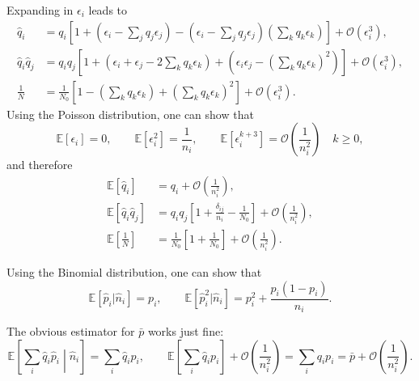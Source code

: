 \documentclass[12pt]{article}
\newcommand{\E}{\mathbb{E}}
\newcommand{\CO}{\mathcal{O}}
\newcommand{\prn}[1]{\left ( #1 \right )}
\newcommand{\brk}[1]{\left [ #1 \right ]}
\begin{document}
Expanding in $\epsilon_i$ leads to
%
\begin{equation}\label{eq:expandeps}
  \begin{aligned}
    \hat{q}_i &= q_i\brk{ 1 + \prn{\epsilon_i-\sum_jq_j\epsilon_j} -  \prn{\epsilon_i-\sum_jq_j\epsilon_j} \prn{\sum_kq_k\epsilon_k} } +\CO\prn{\epsilon_i^3}, \\
    \hat{q}_i\hat{q}_j &= q_iq_j\brk{ 1 + \prn{\epsilon_i+\epsilon_j-2\sum_kq_k\epsilon_k} +  \prn{\epsilon_i\epsilon_j-(\sum_kq_k\epsilon_k)^2} }  +\CO\prn{\epsilon_i^3}, \\
    \frac{1}{N} &= \frac{1}{N_0} \brk{ 1 - \prn{\sum_kq_k\epsilon_k} +  \prn{\sum_kq_k\epsilon_k}^2 } +\CO\prn{\epsilon_i^3}.
  \end{aligned}
\end{equation}
%
Using the Poisson distribution, one can show that
%
\begin{equation}\label{eq:expeps}
    \E\brk{\epsilon_i} = 0, \qquad
    \E\brk{\epsilon_i^2} = \frac{1}{n_i}, \qquad
    \E\brk{\epsilon_i^{k+3}} = \CO\prn{\frac{1}{n_i^2}} \quad k\geq0,
\end{equation}
%
and therefore
%
\begin{equation}\label{eq:expandepsex}
  \begin{aligned}
    \E\brk{\hat{q}_i} &= q_i + \CO\prn{\frac{1}{n_i^2}}, \\
    \E\brk{\hat{q}_i\hat{q}_j} &= q_iq_j\brk{ 1 + \frac{\delta_{ij}}{n_i} -  \frac{1}{N_0}}  + \CO\prn{\frac{1}{n_i^2}}, \\
    \E\brk{\frac{1}{N}} &= \frac{1}{N_0} \brk{ 1  +  \frac{1}{N_0} } + \CO\prn{\frac{1}{n_i^2}}.
  \end{aligned}
\end{equation}
%

Using the Binomial distribution, one can show that
%
\begin{equation}\label{eq:expi}
  \E\brk{\hat{p}_i|\hat{n}_i} = p_i, \qquad
  \E\brk{\hat{p}_i^2|\hat{n}_i} = p_i^2 + \frac{p_i(1-p_i)}{n_i}.
\end{equation}
%

The obvious estimator for $\bar{p}$ works just fine:
%
\begin{equation}\label{eq:pbarest}
  \E\brk{\sum_i\hat{q}_i\hat{p}_i\middle|\hat{n}_i} = \sum_i \hat{q}_ip_i,
  \qquad
  \E\brk{\sum_i\hat{q}_ip_i} + \CO\prn{\frac{1}{n_i^2}} = \sum_iq_ip_i = \bar{p} + \CO\prn{\frac{1}{n_i^2}}.
\end{equation}
%
\end{document}
